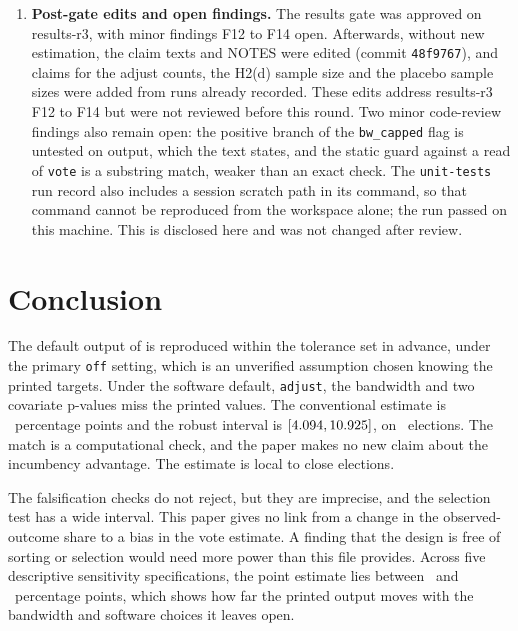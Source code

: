 \documentclass[11pt]{article}
\begin{document}
\begin{enumerate}
\item \textbf{Post-gate edits and open findings.} The results gate was approved on results-r3, with minor findings F12 to F14 open. Afterwards, without new estimation, the claim texts and NOTES were edited (commit \texttt{48f9767}), and claims for the adjust counts, the H2(d) sample size and the placebo sample sizes were added from runs already recorded. These edits address results-r3 F12 to F14 but were not reviewed before this round. Two minor code-review findings also remain open: the positive branch of the \texttt{bw\_capped} flag is untested on output, which the text states, and the static guard against a read of \texttt{vote} is a substring match, weaker than an exact check. The \texttt{unit-tests} run record also includes a session scratch path in its command, so that command cannot be reproduced from the workspace alone; the run passed on this machine. This is disclosed here and was not changed after review.
\end{enumerate}

\section{Conclusion}

The default output of \citet{calonico2017rdrobust} is reproduced within the tolerance set in advance, under the primary \texttt{off} setting, which is an unverified assumption chosen knowing the printed targets. Under the software default, \texttt{adjust}, the bandwidth and two covariate p-values miss the printed values. The conventional estimate is \RdEffect\ percentage points and the robust interval is $[4.094, 10.925]$, on \RdN\ elections. The match is a computational check, and the paper makes no new claim about the incumbency advantage. The estimate is local to close elections.

The falsification checks do not reject, but they are imprecise, and the selection test has a wide interval. This paper gives no link from a change in the observed-outcome share to a bias in the vote estimate. A finding that the design is free of sorting or selection would need more power than this file provides. Across five descriptive sensitivity specifications, the point estimate lies between \RdSensDoubleEst\ and \RdSensHalfEst\ percentage points, which shows how far the printed output moves with the bandwidth and software choices it leaves open.





\end{document}
